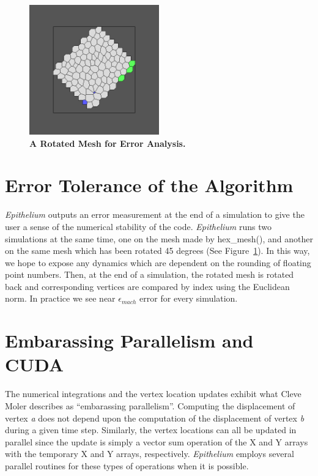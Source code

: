 \begin{figure}[hr]
\centering
\includegraphics[width=0.5\textwidth]{../diagrams/rotate.png}
\caption{\textbf{A Rotated Mesh for Error Analysis.}}
\label{fig:rotate}
\end{figure}

\section{Error Tolerance of the Algorithm}
\emph{Epithelium} outputs an error measurement at the end of a simulation to give the user a sense of the numerical stability of the code. \emph{Epithelium} runs two simulations at the same time, one on the mesh made by hex\_mesh(), and another on the same mesh which has been rotated 45 degrees (See Figure~\ref{fig:rotate}). In this way, we hope to expose any dynamics which are dependent on the rounding of floating point numbers. Then, at the end of a simulation, the rotated mesh is rotated back and corresponding vertices are compared by index using the Euclidean norm. In practice we see near $\epsilon_{mach}$ error for every simulation.

\section{Embarassing Parallelism and CUDA}
The numerical integrations and the vertex location updates exhibit what Cleve Moler describes as ``embarassing parallelism''. Computing the displacement of vertex \emph{a} does not depend upon the computation of the displacement of vertex \emph{b} during a given time step. Similarly, the vertex locations can all be updated in parallel since the update is simply a vector sum operation of the X and Y arrays with the temporary X and Y arrays, respectively. \emph{Epithelium} employs several parallel routines for these types of operations when it is possible. 

